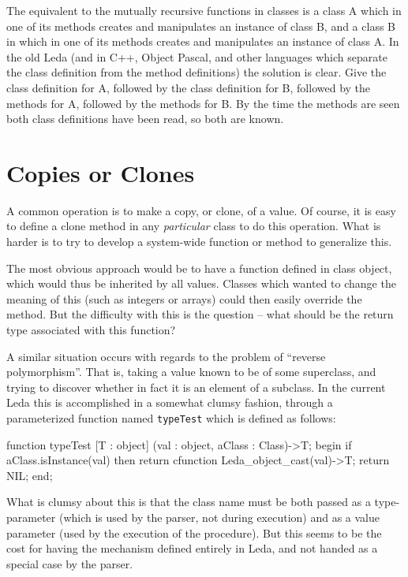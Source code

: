 The equivalent to the mutually recursive functions in classes is
a class A which in one of its methods creates and manipulates
an instance of class B,
and a class B in which in one of its methods creates and manipulates
an instance of class A.  In the old Leda (and in C++, Object Pascal, and
other languages which separate the class definition from the method
definitions) the solution is clear.  Give the class definition for A,
followed by the class definition for B, followed by the methods for A,
followed by the methods for B.  By the time the methods are seen
both class definitions have been read, so both are known.

\section{Copies or Clones}\label{w1}

A common operation is to make a copy, or clone, of a value.
Of course, it is easy to define a clone method in any {\em particular} class
to do this operation.  What is harder is to try to develop a system-wide
function or method to generalize this.

The most obvious approach would be to have a function defined in class
object, which would thus be inherited by all values.  Classes which
wanted to change the meaning of this (such as integers or arrays)
could then easily override the method.  But the difficulty with this
is the question -- what should be the return type associated with this
function?

A similar situation occurs with regards to the problem of ``reverse
polymorphism''.  That is, taking a value known to be of some superclass,
and trying to discover whether in fact it is an element of a subclass.
In the current Leda this is accomplished in a somewhat clumsy fashion,
through a parameterized function named {\tt typeTest} which is defined
as follows:

\begin{cprog}

function typeTest [T : object] (val : object, aClass : Class)->T;
begin
	if aClass.isInstance(val) then
		return cfunction Leda_object_cast(val)->T;
	return NIL;
end;

\end{cprog}

What is clumsy about this is that the class name must be both passed
as a type-parameter (which is used by the parser, not during execution)
and as a value parameter (used by the execution of the procedure).
But this seems to be the cost for having the mechanism defined
entirely in Leda, and not handed as a special case by the parser.

